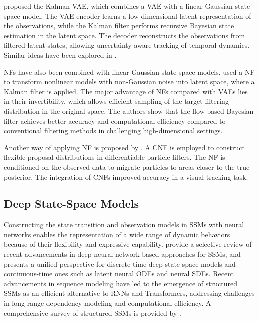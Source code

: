 \citeauthor{fraccaro2017kvae} \citeyearpar{fraccaro2017kvae} proposed the Kalman \ac{VAE}, which combines a \ac{VAE} with a linear Gaussian state-space model. The \ac{VAE} encoder learns a low-dimensional latent representation of the observations, while the Kalman filter performs recursive Bayesian state estimation in the latent space. The decoder reconstructs the observations from filtered latent states, allowing uncertainty-aware tracking of temporal dynamics. Similar ideas have been explored in \citep{pasmans2025ekfl, ZHANG2023106424}. 

\acp{NF} have also been combined with linear Gaussian state-space models. \citeauthor{wang2025flow} \citeyearpar{wang2025flow} used a \ac{NF} to transform nonlinear models with non-Gaussian noise into latent space, where a Kalman filter is applied. The major advantage of \acp{NF} compared with \acp{VAE} lies in their invertibility, which allows efficient sampling of the target filtering distribution in the original space. The authors show that the flow-based Bayesian filter achieves better accuracy and computational efficiency compared to conventional filtering methods in challenging high-dimensional settings.

Another way of applying \ac{NF} is proposed by \citeauthor{chen2021dpfcnf} \citeyearpar{chen2021dpfcnf}. A \ac{CNF} is employed to construct flexible proposal distributions in differentiable particle filters. The \ac{NF} is conditioned on the observed data to migrate particles to areas closer to the true posterior. The integration of \acp{CNF} improved accuracy in a visual tracking task. 

\subsection{Deep State-Space Models}\label{sec:literature:deep_state_space_model}
Constructing the state transition and observation models in \acp{SSM} with neural networks enables the representation of a wide range of dynamic behaviors because of their flexibility and expressive capability. \citet{lin2024ssm} provide a selective review of recent advancements in deep neural network-based approaches for \acp{SSM}, and presents a unified perspective for discrete-time deep state-space models and continuous-time ones such as latent neural \acp{ODE} and neural \acp{SDE}. Recent advancements in sequence modeling have led to the emergence of structured \acp{SSM} as an efficient alternative to \acp{RNN} and Transformers, addressing challenges in long-range dependency modeling and computational efficiency. A comprehensive survey of structured \acp{SSM} is provided by \citeauthor{somvanshi2025s4mamba} \citeyearpar{somvanshi2025s4mamba}. 

